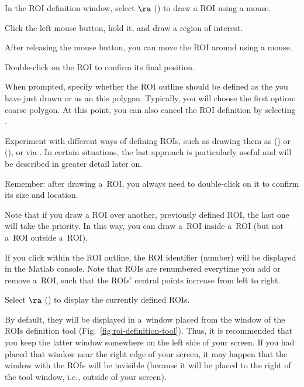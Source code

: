\setcounter{step}{0}

\s In the ROI definition window, select  $\ra$  () to draw a ROI using a mouse.

\bul Click the left mouse button, hold it, and draw a region of interest. 

\bul After releasing the mouse button, you can move the ROI around using a mouse. 

\bul Double-click on the ROI to confirm its final position.

\bul When prompted, specify whether the ROI outline should be defined as the  you have just drawn or as an  this polygon. Typically, you will choose the first option: coarse polygon. At this point, you can also cancel the ROI definition by selecting .

\s Experiment with different ways of defining ROIs, such as drawing them as  () or  (), or via . In certain situations, the last approach is particularly useful and will be described in greater detail later on.

\bul Remember: after drawing a~ROI, you always need to double-click on it to confirm its size and location.

\bul Note that if you draw a ROI over another, previously defined ROI, the last one will take the priority. In this way, you can draw a~ROI inside a~ROI (but not a~ROI outside a~ROI).

\bul If you click within the ROI outline, the ROI identifier (number) will be displayed in the Matlab console. Note that ROIs are renumbered everytime you add or remove a~ROI, such that the ROIs' central points increase from left to right.

\s Select  $\ra$  () to display the currently defined ROIs.

\bul By default, they will be displayed in a~window placed  from the window of the ROIs definition tool (Fig.~\ref{fig:roi-definition-tool}). Thus, it is recommended that you keep the latter window somewhere on the left side of your screen. If you had placed that window near the right edge of your screen, it may happen that the window with the ROIs will be invisible (because it will be placed to the right of the tool window, i.e., outside of your screen).

